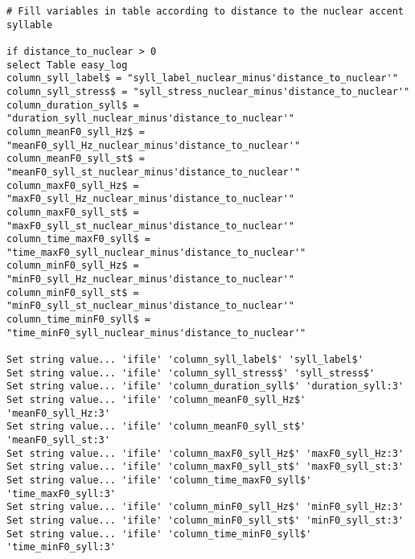 \begin{Verbatim}[fontsize=\tiny]
# Fill variables in table according to distance to the nuclear accent syllable

if distance_to_nuclear > 0
select Table easy_log
column_syll_label$ = "syll_label_nuclear_minus'distance_to_nuclear'"
column_syll_stress$ = "syll_stress_nuclear_minus'distance_to_nuclear'"
column_duration_syll$ = "duration_syll_nuclear_minus'distance_to_nuclear'"
column_meanF0_syll_Hz$ = "meanF0_syll_Hz_nuclear_minus'distance_to_nuclear'"
column_meanF0_syll_st$ = "meanF0_syll_st_nuclear_minus'distance_to_nuclear'"
column_maxF0_syll_Hz$ = "maxF0_syll_Hz_nuclear_minus'distance_to_nuclear'"
column_maxF0_syll_st$ = "maxF0_syll_st_nuclear_minus'distance_to_nuclear'"
column_time_maxF0_syll$ = "time_maxF0_syll_nuclear_minus'distance_to_nuclear'"
column_minF0_syll_Hz$ = "minF0_syll_Hz_nuclear_minus'distance_to_nuclear'"
column_minF0_syll_st$ = "minF0_syll_st_nuclear_minus'distance_to_nuclear'"
column_time_minF0_syll$ = "time_minF0_syll_nuclear_minus'distance_to_nuclear'"

Set string value... 'ifile' 'column_syll_label$' 'syll_label$'
Set string value... 'ifile' 'column_syll_stress$' 'syll_stress$'
Set string value... 'ifile' 'column_duration_syll$' 'duration_syll:3'
Set string value... 'ifile' 'column_meanF0_syll_Hz$' 'meanF0_syll_Hz:3'
Set string value... 'ifile' 'column_meanF0_syll_st$' 'meanF0_syll_st:3'
Set string value... 'ifile' 'column_maxF0_syll_Hz$' 'maxF0_syll_Hz:3'
Set string value... 'ifile' 'column_maxF0_syll_st$' 'maxF0_syll_st:3'
Set string value... 'ifile' 'column_time_maxF0_syll$' 'time_maxF0_syll:3'
Set string value... 'ifile' 'column_minF0_syll_Hz$' 'minF0_syll_Hz:3'
Set string value... 'ifile' 'column_minF0_syll_st$' 'minF0_syll_st:3'
Set string value... 'ifile' 'column_time_minF0_syll$' 'time_minF0_syll:3'


\end{Verbatim}
